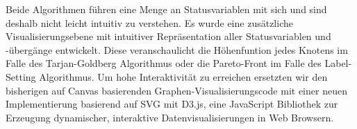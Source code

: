 Beide Algorithmen f\"uhren eine Menge an Statusvariablen mit sich und sind deshalb nicht leicht intuitiv zu verstehen. Es wurde eine zus\"atzliche Visualisierungsebene mit intuitiver Repr\"asentation aller Statusvariablen und -\"uberg\"ange entwickelt. Diese veranschaulicht die H\"ohenfuntion jedes Knotens im Falle des Tarjan-Goldberg Algorithmus oder die Pareto-Front im Falle des Label-Setting Algorithmus. Um hohe Interaktivit\"at zu erreichen ersetzten wir den bisherigen auf Canvas basierenden Graphen-Visualisierungscode mit einer neuen Implementierung basierend auf SVG mit D3.js, eine JavaScript Bibliothek zur Erzeugung dynamischer, interaktive Datenvisualisierungen in Web Browsern.


